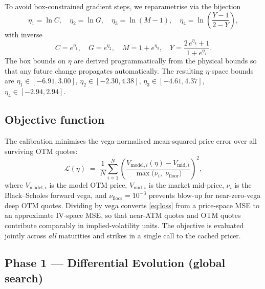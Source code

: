 \documentclass[11pt,a4paper]{article}
\begin{document}
To avoid box-constrained gradient steps, we reparametrise via the
bijection
\begin{equation}
  \eta_1 = \ln C, \quad
  \eta_2 = \ln G, \quad
  \eta_3 = \ln(M - 1), \quad
  \eta_4 = \ln\!\left(\frac{Y-1}{2-Y}\right),
  \label{eq:transform}
\end{equation}
with inverse
\[
  C = e^{\eta_1}, \quad
  G = e^{\eta_2}, \quad
  M = 1 + e^{\eta_3}, \quad
  Y = \frac{2\,e^{\eta_4} + 1}{1 + e^{\eta_4}}.
\]
The box bounds on $\eta$ are derived programmatically from the physical
bounds so that any future change propagates automatically.
The resulting $\eta$-space bounds are
$\eta_1 \in [-6.91, 3.00]$,
$\eta_2 \in [-2.30, 4.38]$,
$\eta_3 \in [-4.61, 4.37]$,
$\eta_4 \in [-2.94, 2.94]$.

\subsection{Objective function}

The calibration minimises the vega-normalised mean-squared price error over
all surviving OTM quotes:
\begin{equation}
  \mathcal{L}(\eta) \;=\; \frac{1}{N}
  \sum_{i=1}^{N}
  \left(\frac{V_{\text{model},i}(\eta) - V_{\text{mid},i}}
             {\max\!\bigl(\nu_i,\; \nu_{\text{floor}}\bigr)}\right)^{\!\!2},
  \label{eq:loss}
\end{equation}
where $V_{\text{model},i}$ is the model OTM price, $V_{\text{mid},i}$ is
the market mid-price, $\nu_i$ is the Black--Scholes forward vega,
and $\nu_{\text{floor}} = 10^{-3}$ prevents blow-up for near-zero-vega
deep OTM quotes.
Dividing by vega converts \eqref{eq:loss} from a price-space MSE to an
approximate IV-space MSE, so that near-ATM quotes and OTM quotes contribute
comparably in implied-volatility units.
The objective is evaluated jointly across \emph{all} maturities and strikes
in a single call to the cached pricer.

\subsection{Phase 1 — Differential Evolution (global search)}
\end{document}
